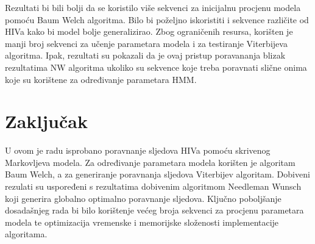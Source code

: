 \documentclass[times, utf8, seminar, numeric]{fer}
\begin{document}
Rezultati bi bili bolji da se koristilo više sekvenci za inicijalnu procjenu modela pomoću Baum Welch algoritma. Bilo bi poželjno iskoristiti i sekvence različite od HIVa kako bi model bolje generalizirao. Zbog ograničenih resursa, korišten je manji broj sekvenci za učenje parametara modela i za testiranje Viterbijeva algoritma. Ipak, rezultati su pokazali da je ovaj pristup poravananja blizak rezultatima NW algoritma ukoliko su sekvence koje treba poravnati slične onima koje su korištene za određivanje parametara HMM.

\chapter{Zaključak}
U ovom je radu isprobano poravnanje sljedova HIVa pomoću skrivenog Markovljeva modela. Za određivanje parametara modela korišten je algoritam Baum Welch, a za generiranje poravnanja sljedova Viterbijev algoritam. Dobiveni rezulati su uspoređeni s rezultatima dobivenim algoritmom Needleman Wunsch koji generira globalno optimalno poravnanje sljedova. Ključno poboljšanje dosadašnjeg rada bi bilo korištenje većeg broja sekvenci za procjenu parametara modela te optimizacija vremenske i memorijske složenosti implementacije algoritama.
 
\nocite{*}


\end{document}
